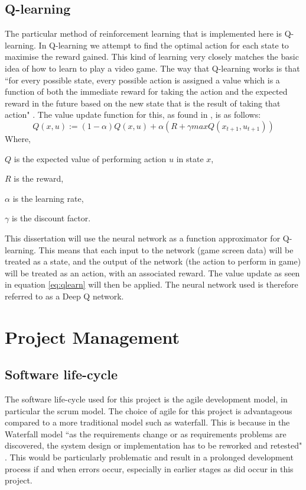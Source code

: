 \documentclass[10pt]{article}
\begin{document}
		\subsection{Q-learning}
		The particular method of reinforcement learning that is implemented here is Q-learning. In Q-learning we attempt to find the optimal action for each state to maximise the reward gained. This kind of learning very closely matches the basic idea of how to learn to play a video game. The way that Q-learning works is that ``for every possible state, every possible action is assigned a value which is a function of both the immediate reward for taking the action and the expected reward in the future based on the new state that is the result of taking that action" \cite{qlearning}. The value update function for this, as found in \cite{qlearning}, is as follows:
		\begin{equation}\label{eq:qlearn}
			Q(x,u) := (1 - \alpha)Q(x,u) + \alpha(R + \gamma maxQ(x_{t+1},u_{t+1}))
		\end{equation}				
		Where, 
		\begin{list}{•}{•}
			\item $Q$ is the expected value of performing action $u$ in state $x$,
			\item $R$ is the reward,
			\item $\alpha$ is the learning rate,
			\item $\gamma$ is the discount factor.
		\end{list}
		This dissertation will use the neural network as a function approximator for Q-learning. This means that each input to the network (game screen data) will be treated as a state, and the output of the network (the action to perform in game) will be treated as an action, with an associated reward. The value update as seen in equation \ref{eq:qlearn} will then be applied. The neural network used is therefore referred to as a Deep Q network.
		
		\bigskip
	
\section{Project Management}
	\subsection{Software life-cycle}
		The software life-cycle used for this project is the agile development model, in particular the scrum model. The choice of agile for this project is advantageous compared to a more traditional model such as waterfall. This is because in the Waterfall model ``as the requirements change or as requirements problems are discovered, the system design or implementation has to be reworked and retested" \cite{swengi}. This would be particularly problematic and result in a prolonged development process if and when errors occur, especially in earlier stages as did occur in this project.\\
		
\end{document}
